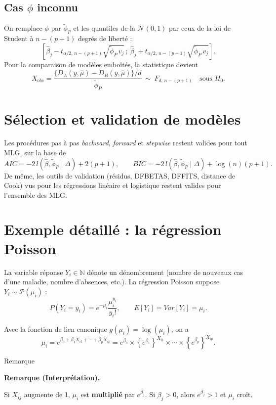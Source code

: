 \documentclass[
  french,
  letterpaper,
  DIV=11,
  numbers=noendperiod]{scrreprt}
\begin{document}
\subsection{\texorpdfstring{Cas \(\phi\)
inconnu}{Cas \textbackslash phi inconnu}}\label{cas-phi-inconnu}

On remplace \(\phi\) par \(\tilde\phi_P\) et les quantiles de la
\(\mathcal{N}(0,1)\) par ceux de la loi de Student à \(n-(p+1)\) degrés
de liberté :
\[\left[\hat\beta_j - t_{\alpha/2,\,n-(p+1)}\sqrt{\tilde\phi_P\, v_j}\,;\ \hat\beta_j + t_{\alpha/2,\,n-(p+1)}\sqrt{\tilde\phi_P\, v_j}\right].\]
Pour la comparaison de modèles emboîtés, la statistique devient
\[X_{obs} = \frac{\{D_A(y,\hat\mu) - D_B(y,\hat\mu)\}/d}{\tilde\phi_P}\ \sim\ F_{d,\,n-(p+1)} \quad\mbox{sous } H_0.\]

\section{Sélection et validation de
modèles}\label{suxe9lection-et-validation-de-moduxe8les}

Les procédures pas à pas \emph{backward}, \emph{forward} et
\emph{stepwise} restent valides pour tout MLG, sur la base de
\[AIC = -2\,l(\hat\beta,\tilde\phi_P\mid\Delta) + 2(p+1), \qquad BIC = -2\,l(\hat\beta,\tilde\phi_P\mid\Delta) + \log(n)(p+1).\]
De même, les outils de validation (résidus, DFBETAS, DFFITS, distance de
Cook) vus pour les régressions linéaire et logistique restent valides
pour l'ensemble des MLG.

\section{Exemple détaillé : la régression Poisson}\label{sec-poisson}

La variable réponse \(Y_i \in \mathbb{N}\) dénote un dénombrement
(nombre de nouveaux cas d'une maladie, nombre d'absences, etc.). La
régression Poisson suppose \(Y_i \sim \mathcal{P}(\mu_i)\) :
\[P(Y_i = y_i) = e^{-\mu_i}\frac{\mu_i^{y_i}}{y_i!}, \qquad E[Y_i] = Var[Y_i] = \mu_i.\]

Avec la fonction de lien canonique \(g(\mu_i) = \log(\mu_i)\), on a
\[\mu_i = e^{\beta_0 + \beta_1 X_{i1} + \cdots + \beta_p X_{ip}} = e^{\beta_0}\times\left\{e^{\beta_1}\right\}^{X_{i1}}\times\cdots\times\left\{e^{\beta_p}\right\}^{X_{ip}}.\]

{Remarque}

\textbf{Remarque (Interprétation).}

Si \(X_{ij}\) augmente de 1, \(\mu_i\) est \textbf{multiplié} par
\(e^{\beta_j}\). Si \(\beta_j > 0\), alors \(e^{\beta_j} > 1\) et
\(\mu_i\) croît.
\end{document}
